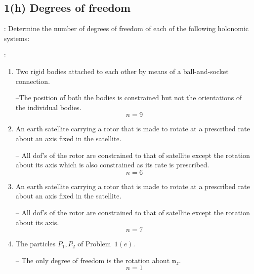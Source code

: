 \subsection{1(h) Degrees of freedom}

: Determine the number of degrees of freedom of each of the following holonomic systems:

:

\begin{enumerate}
    \item Two rigid bodies attached to each other by means of a ball-and-socket connection.

    --The position of both the bodies is constrained but not the orientations of the individual bodies.
    $$n=9$$

    \item An earth satellite carrying a rotor that is made to rotate at a prescribed rate about an axis fixed in the satellite.

    -- All dof's of the rotor are constrained to that of satellite except the rotation about its axis which is also constrained as its rate is prescribed.
    $$n = 6$$

    \item An earth satellite carrying a rotor that is made to rotate at a prescribed rate about an axis fixed in the satellite.

    -- All dof's of the rotor are constrained to that of satellite except the rotation about its axis.
    $$n = 7$$

    \item The particles $P_1, P_2$ of Problem~$1(e)$.

    -- The only degree of freedom is the rotation about $\pmb n_z$.
    $$n=1$$
\end{enumerate}
